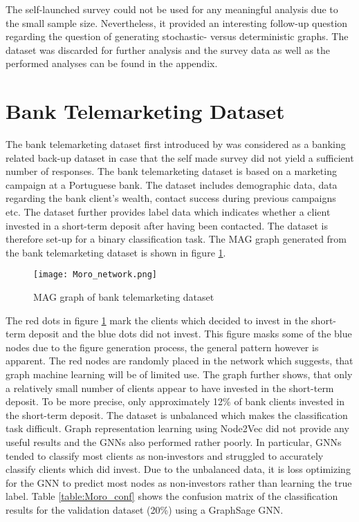   \noindent The self-launched survey could not be used for any meaningful
  analysis due to the small sample size. Nevertheless, it provided an
  interesting follow-up question regarding the question of generating
  stochastic- versus deterministic graphs. The dataset was discarded for
  further analysis and the survey data as well as the performed analyses can be
  found in the appendix. 

  \section{Bank Telemarketing Dataset}

  The bank telemarketing dataset first introduced by 
  \cite{moro2011using,moro2014data} was considered as a banking related back-up 
  dataset in case that the self made survey did not yield a sufficient number of 
  responses. The bank telemarketing dataset is based on a marketing campaign at 
  a Portuguese bank. The dataset includes demographic data, data regarding the 
  bank client's wealth, contact success during previous campaigns etc. The
  dataset further provides label data which indicates whether a client invested
  in a short-term deposit after having been contacted. The dataset is therefore
  set-up for a binary classification task. The MAG graph generated from the
  bank telemarketing dataset is shown in figure \ref{fig:Moro}.
 
	\begin{figure}[h]
		\centering
		\texttt{[image: Moro\_network.png]}
		\caption{MAG graph of bank telemarketing dataset}
        \label{fig:Moro}
	\end{figure}
  
  \noindent The red dots in figure \ref{fig:Moro} mark the clients which
  decided to invest in the short-term deposit and the blue dots did not invest.
  This figure masks some of the blue nodes due to the figure generation
  process, the general pattern however is apparent. The red nodes are randomly 
  placed in the network which suggests, that graph machine learning will be of
  limited use. The graph further shows, that only a relatively small number of 
  clients appear to have invested in the short-term deposit. To be more precise, 
  only approximately 12\% of bank clients invested in the short-term deposit. 
  The dataset is unbalanced which makes the classification task difficult. Graph 
  representation learning using Node2Vec did not provide any useful results and 
  the GNNs also performed rather poorly. In particular, GNNs tended to classify 
  most clients as non-investors and struggled to accurately classify clients 
  which did invest. Due to the unbalanced data, it is loss optimizing for the
  GNN to predict most nodes as non-investors rather than learning the true
  label. Table \ref{table:Moro_conf} shows the confusion matrix of the 
  classification results for the validation dataset (20\%) using a GraphSage GNN.

